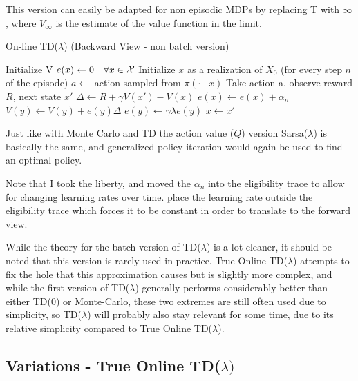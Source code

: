 This version can easily be adapted for non episodic MDPs by replacing T with \(\infty\), where \(V_\infty\) is the estimate of the value function in the limit. 

\begin{algorithm}
	\caption{On-line TD(\(\lambda\)) (Backward View - non batch version)}\label{TD(lambda) algo}
	\begin{algorithmic}[1]
		\State Initialize V
		\State \(e(x)\gets 0 \quad \forall x\in\mathcal{X}\)
			\State Initialize \(x\) as a realization of \(X_0\)
			\Repeat (for every step \(n\) of the episode)
				\State \(a\gets\) action sampled from \(\pi(\cdot \mid x)\) 
				\State Take action a, observe reward \(R\), next state \(x'\)
				\State \(\Delta\gets R + \gamma V(x') -V(x)\) 
				\State \(e(x)\gets e(x) + \alpha_n \)
				\label{eligibility assignment}
					\State \(V(y)\gets V(y) + e(y) \Delta \)
					\State \(e(y) \gets \gamma\lambda e(y)\)
				\EndFor
				\State \(x\gets x'\)
		\EndWhile
	\end{algorithmic}
\end{algorithm}

Just like with Monte Carlo and TD the action value (\(Q\)) version Sarsa(\(\lambda\)) is basically the same, and generalized policy iteration would again be used to find an optimal policy.

Note that I took the liberty, and moved the \(\alpha_n\) into the eligibility trace to allow for changing learning rates over time. \textcite{suttonReinforcementLearningIntroduction1998} place the learning rate outside the eligibility trace which forces it to be constant in order to translate to the forward view. 

While the theory for the batch version of TD(\(\lambda\)) is a lot cleaner, it should be noted that this version is rarely used in practice. True Online TD(\(\lambda\)) attempts to fix the hole that this approximation causes but is slightly more complex, and while the first version of TD(\(\lambda\)) generally performs considerably better than either TD(0) or Monte-Carlo, these two extremes are still often used due to simplicity, so TD(\(\lambda\)) will probably also stay relevant for some time, due to its relative simplicity compared to True Online TD(\(\lambda\)).

\subsection{Variations - True Online TD(\(\lambda)\)}


